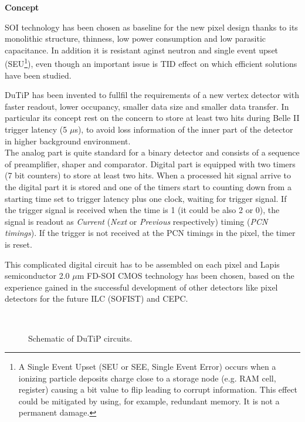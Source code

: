 \begin{description}
\item \textbf{Concept}
\end{description}

SOI technology has been chosen as baseline for the new pixel design thanks to its monolithic structure, thinness, low power consumption and low parasitic capacitance. In addition it is resistant aginst neutron and single event upset (SEU\footnote{A Single Event Upset (SEU or SEE, Single Event Error) occurs when a ionizing particle deposits charge close to a storage node (e.g. RAM cell, register) causing a bit value to flip leading to corrupt information. This effect could be mitigated by using, for example, redundant memory. It is not a permanent damage.}), even though an important issue is TID effect on which efficient solutions have been studied.

DuTiP has been invented to fullfil the requirements of a new vertex detector with faster readout, lower occupancy, smaller data size and smaller data transfer. In particular its concept rest on the concern to store at least two hits during Belle II trigger latency (5 $\mu$s), to avoid loss information of the inner part of the detector in higher background environment. \\

The analog part is quite standard for a binary detector and consists of a sequence of preamplifier, shaper and comparator. Digital part is equipped with two timers (7 bit counters) to store at least two hits. When a processed hit signal arrive to the digital part it is stored and one of the timers start to counting down from a starting time set to trigger latency plus one clock, waiting for trigger signal. If the trigger signal is received when the time is 1 (it could be also 2 or 0), the signal is readout as \emph{Current} (\emph{Next} or \emph{Previous} respectively) timing (\emph{PCN timings}). If the trigger is not received at the PCN timings in the pixel, the timer is reset. 

This complicated digital circuit has to be assembled on each pixel and Lapis semiconductor 2.0 $\mu$m FD-SOI CMOS technology has been chosen, based on the experience gained in the successful development of other detectors like pixel detectors for the future ILC (SOFIST) and CEPC.

\begin{figure}[h!]
\centering
{}\quad
{}\\
\caption{Schematic of DuTiP circuits.}
\label{SOI}
\end{figure}

